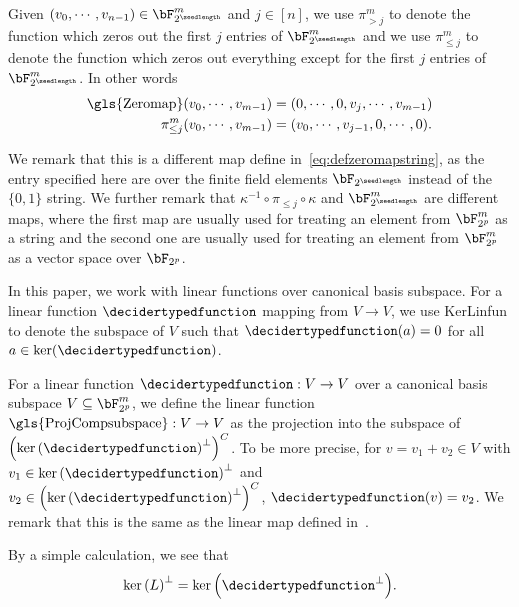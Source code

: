 Given $(v_0, \cdots, v_{n-1}) \in \bF_{2^{ \seedlength}}^m$ and $j \in [n]$, we use $\pi_{> j}^m$ to denote the function which zeros out the first $j$ entries of $\bF_{2^{\seedlength}}^m$ and we use $\pi_{\leq j}^m$ to denote the function which zeros out everything except for the first $j$ entries of $\bF_{2^{ \seedlength}}^m$. In other words 
\begin{align}
\text{\gls{Zeromap}}(v_0, \cdots, v_{m-1}) &= (0, \cdots, 0, v_j, \cdots, v_{m-1}) \label{eq:defzeromapfield} \\
\nonumber \pi_{\leq j}^m(v_0, \cdots, v_{m-1}) &= (v_0, \cdots, v_{j-1}, 0, \cdots, 0).
\end{align}

We remark that this is a different map define in~\eqref{eq:defzeromapstring}, as the entry specified here are over the finite field elements $\bF_{2^{ \seedlength}}$ instead of the $\{0,1\}$ string. We further remark that $\kappa^{-1} \circ \pi_{\leq j} \circ \kappa$ and $\bF_{2^\seedlength}^{m}$ are different maps, where the first map are usually used for treating an element from $\bF_{2^p}^{m}$ as a string and the second one are usually used for treating an element from $\bF_{2^p}^{m}$ as a vector space over $\bF_{2^p}$. 

In this paper, we work with linear functions over canonical basis subspace. For a linear function $\decidertypedfunction$ mapping from $V \rightarrow V$, we use \gls{KerLinfun} to denote the subspace of $V$ such that $\decidertypedfunction(a) = 0$ for all $a \in \ker(\decidertypedfunction)$. 

For a linear function $\decidertypedfunction: V \rightarrow V$ over a canonical basis subspace $V \subseteq \bF_{2^p}^m$, we define the linear function $\text{\gls{ProjCompsubspace}}: V \rightarrow V$ as the projection into the subspace of $\left(\ker{(\decidertypedfunction)}^{\bot}\right)^{C}$. To be more precise, for $v = v_1 + v_2 \in V$ with $v_1 \in \ker{(\decidertypedfunction)}^{\bot}$ and $v_2 \in \left(\ker{(\decidertypedfunction)}^{\bot}\right)^{C}$, $\decidertypedfunction(v) = v_2$. We remark that this is the same as the linear map defined in~\cite[Definition 3.11]{jiMIPRE2022a}. 

By a simple calculation, we see that
\begin{equation*}
	\ker{(L)}^{\bot}=  \ker{\left(\decidertypedfunction^{\bot}\right)}. 
\end{equation*}

